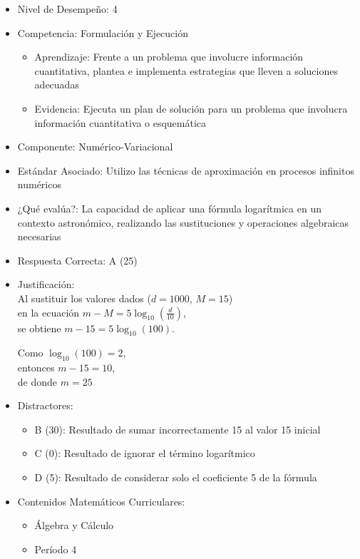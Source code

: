 \documentclass[
]{article}
\providecommand{\tightlist}{%
  \setlength{\itemsep}{0pt}\setlength{\parskip}{0pt}}
\begin{document}
\begin{itemize}
\item
  Nivel de Desempeño: 4
\item
  Competencia: Formulación y Ejecución

  \begin{itemize}
  \tightlist
  \item
    Aprendizaje: Frente a un problema que involucre información
    cuantitativa, plantea e implementa estrategias que lleven a
    soluciones adecuadas
  \item
    Evidencia: Ejecuta un plan de solución para un problema que
    involucra información cuantitativa o esquemática
  \end{itemize}
\item
  Componente: Numérico-Variacional
\item
  Estándar Asociado: Utilizo las técnicas de aproximación en procesos
  infinitos numéricos
\item
  ¿Qué evalúa?: La capacidad de aplicar una fórmula logarítmica en un
  contexto astronómico, realizando las sustituciones y operaciones
  algebraicas necesarias
\item
  Respuesta Correcta: A (25)
\item
  Justificación:\\
  Al sustituir los valores dados (\(d=1000\), \(M=15\))\\
  en la ecuación \(m - M = 5 \log_{10} \left(\frac{d}{10}\right)\),\\
  se obtiene \(m - 15 = 5 \log_{10}(100)\). ~

  Como \(\log_{10}(100)=2\),\\
  entonces \(m - 15 = 10\),\\
  de donde \(m = 25\)
\item
  Distractores:

  \begin{itemize}
  \tightlist
  \item
    B (30): Resultado de sumar incorrectamente 15 al valor 15 inicial
  \item
    C (0): Resultado de ignorar el término logarítmico
  \item
    D (5): Resultado de considerar solo el coeficiente 5 de la fórmula
  \end{itemize}
\item
  Contenidos Matemáticos Curriculares:

  \begin{itemize}
  \tightlist
  \item
    Álgebra y Cálculo
  \item
    Período 4


\end{itemize}
\end{itemize}
\end{document}

